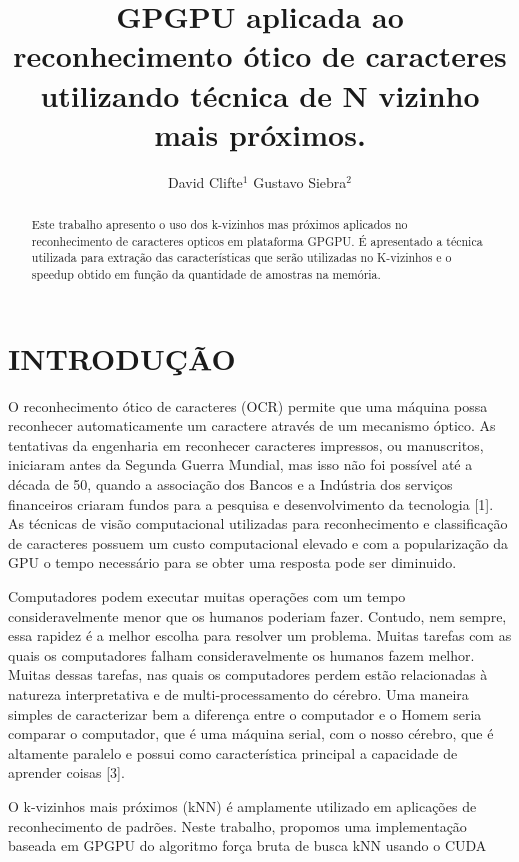 \documentclass[letterpaper, 10 pt, conference]{ieeeconf}  %
\title{\LARGE \bf
GPGPU aplicada ao reconhecimento ótico de caracteres utilizando técnica de N vizinho mais próximos.
}
\author{David Clifte$^{1}$  Gustavo Siebra$^{2}$%
}
\begin{document}
\maketitle
\thispagestyle{empty}
\pagestyle{empty}


\begin{abstract}
Este trabalho apresento o uso dos k-vizinhos mas próximos aplicados no
reconhecimento de caracteres opticos em plataforma GPGPU. É apresentado a
técnica utilizada para extração das características que serão utilizadas no
K-vizinhos e o speedup obtido em função da quantidade de amostras na memória.
\end{abstract}


\section{INTRODUÇÃO}

O reconhecimento ótico de caracteres (OCR) permite que uma máquina possa
reconhecer automaticamente um caractere através de um mecanismo óptico. As tentativas
da engenharia em reconhecer caracteres impressos, ou manuscritos, iniciaram antes da
Segunda Guerra Mundial, mas isso não foi possível até a década de 50, quando a associação
dos Bancos e a Indústria dos serviços financeiros criaram fundos para a pesquisa e
desenvolvimento da tecnologia [1]. As técnicas de visão computacional
utilizadas para reconhecimento e classificação de caracteres possuem um custo
computacional elevado e com a popularização da GPU o tempo necessário para se
obter uma resposta pode ser diminuido.

Computadores podem executar muitas operações com um tempo consideravelmente
menor que os humanos poderiam fazer. Contudo, nem sempre, essa rapidez é a melhor
escolha para resolver um problema. Muitas tarefas com as quais os computadores falham
consideravelmente os humanos fazem melhor. Muitas dessas tarefas, nas quais os computadores
perdem estão relacionadas à natureza interpretativa e de multi-processamento do
cérebro. Uma maneira simples de caracterizar bem a diferença entre o computador e o
Homem seria comparar o computador, que é uma máquina serial, com o nosso cérebro,
que é altamente paralelo e possui como característica principal a capacidade de aprender
coisas [3].

O k-vizinhos mais próximos (kNN) é amplamente utilizado em aplicações de
reconhecimento de padrões.
Neste trabalho, propomos uma implementação baseada em GPGPU do algoritmo
força bruta de busca kNN usando o CUDA
\end{document}
